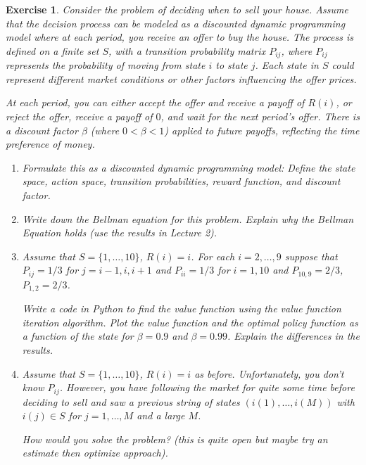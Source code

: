 \documentclass[letter,11pt]{article}
\newtheorem{exercise}{Exercise}[section]
\begin{document}
\begin{exercise}
    Consider the problem of deciding when to sell your house. Assume that the decision process can be modeled as a discounted dynamic programming model where at each period, you receive an offer to buy the house. The process is defined on a finite set \( S \), with a transition probability matrix \( P_{ij} \), where \( P_{ij} \) represents the probability of moving from state \( i \) to state \( j \). Each state in \( S \) could represent different market conditions or other factors influencing the offer prices.

At each period, you can either accept the offer and receive a payoff of \( R(i) \), or reject the offer, receive a payoff of \( 0 \), and wait for the next period's offer. There is a discount factor \( \beta \) (where \( 0 < \beta < 1 \)) applied to future payoffs, reflecting the time preference of money.


\begin{enumerate}
  \item Formulate this as a discounted dynamic programming model:
  Define the state space, action space, transition probabilities, reward function, and discount factor. 

  \item Write down the Bellman equation for this problem. Explain why the Bellman Equation holds (use the results in Lecture 2). 

  \item Assume that $S=\{ 1, \ldots, 10 \}$, $R(i) = i$. For each $i=2,\ldots,9$ suppose that $P_{ij} = 1/3$ for $j=i-1,i,i+1$ and $P_{ii}=1/3$ for $i=1,10$ and  $P_{10,9} = 2/3$, $P_{1,2}=2/3$. 

  Write a code in Python to find the value function using  the value function iteration algorithm. Plot the value function and the optimal policy function as a function of the state for $\beta = 0.9$ and $\beta = 0.99$. Explain the differences in the results. 

  \item Assume that $S=\{ 1, \ldots, 10 \}$, $R(i) = i$ as before. Unfortunately, you don't know $P_{ij}$. However, you have following the market for quite some time before deciding to sell and saw a previous string of states $(i(1),\ldots,i(M))$ with $i(j) \in S$ for $j=1,\ldots,M$ and a large $M$. 

  How would you solve the problem? 
  (this is quite open but maybe try an estimate then optimize approach).  
\end{enumerate}

\end{exercise}
\end{document}
